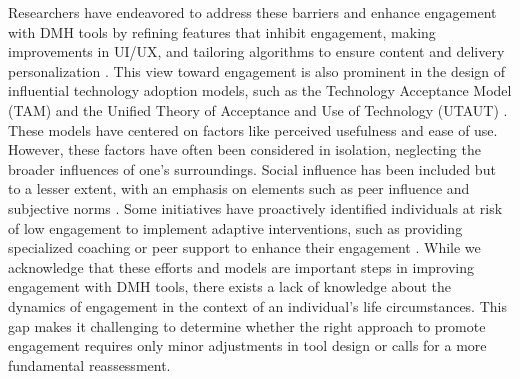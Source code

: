 Researchers have endeavored to address these barriers and enhance engagement with DMH tools by refining features that inhibit engagement, making improvements in UI/UX, and tailoring algorithms to ensure content and delivery personalization \cite{doherty2012engagement, harding2015hci, poole2013hci, xu2013designing, howe2022design, lipschitz2023engagement}. This view toward engagement is also prominent in the design of influential technology adoption models, such as the Technology Acceptance Model (TAM) \cite{venkatesh2008technology, davis1989perceived} and the Unified Theory of Acceptance and Use of Technology (UTAUT) \cite{venkatesh2003user, dwivedi2019re}. %
These models have centered on factors like perceived usefulness and ease of use. However, these factors have often been considered in isolation, neglecting the broader influences of one's surroundings. Social influence has been included but to a lesser extent, with an emphasis on elements such as peer influence and subjective norms \cite{marangunic2015technology}. Some initiatives have proactively identified individuals at risk of low engagement to implement adaptive interventions, such as providing specialized coaching or peer support to enhance their engagement \cite{arnold2019predicting, lipschitz2023engagement}. While we acknowledge that these efforts and models are important steps in improving engagement with DMH tools, there exists a lack of knowledge about the dynamics of engagement in the context of an individual's life circumstances. This gap makes it challenging to determine whether the right approach to promote engagement requires only minor adjustments in tool design or calls for a more fundamental reassessment.



